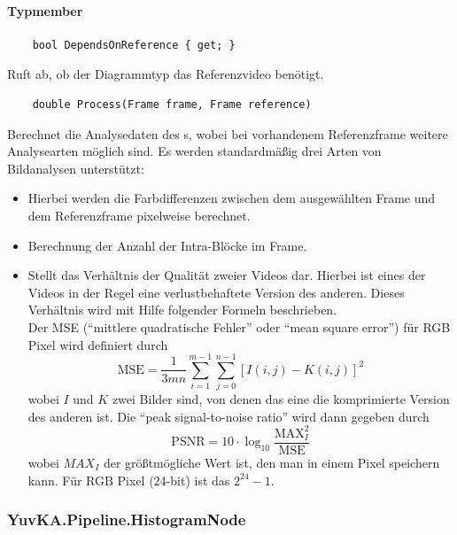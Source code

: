 \paragraph{Typmember}
\begin{itemize}

	\begin{verbatim}
	bool DependsOnReference { get; } 
	\end{verbatim}
	Ruft ab, ob der Diagrammtyp das Referenzvideo benötigt.
	
	\begin{verbatim}
	double Process(Frame frame, Frame reference)
	\end{verbatim}
	Berechnet die Analysedaten des s, wobei bei vorhandenem Referenzframe weitere Analysearten möglich sind. Es werden standardmäßig drei Arten von Bildanalysen unterstützt:
		\begin{itemize}
			\item {} Hierbei werden die Farbdifferenzen zwischen dem ausgewählten Frame und dem Referenzframe pixelweise berechnet.
			\item {} Berechnung der Anzahl der Intra-Blöcke im Frame.
			\item {} Stellt das Verhältnis der Qualität zweier Videos dar. Hierbei ist eines der Videos in der Regel eine verlustbehaftete Version des anderen. Dieses Verhältnis wird mit Hilfe folgender Formeln beschrieben. \\
			Der MSE (``mittlere quadratische Fehler'' oder ``mean square error'') für RGB Pixel wird definiert durch 
			\[ \text{MSE} = \frac{1}{3mn} \sum_{i = 1}^{m - 1}{ \sum_{j = 0}^{n - 1}{[I(i, j) - K(i, j)]^2} } \]
			wobei $ I $ und $ K $ zwei Bilder sind, von denen das eine die komprimierte Version des anderen ist. Die ``peak signal-to-noise ratio'' wird dann gegeben durch
			\[ \text{PSNR} = 10 \cdot \log_{10}{\frac{\text{MAX}_I^2}{\text{MSE}}} \]
			wobei $ MAX_I $ der größtmögliche Wert ist, den man in einem Pixel speichern kann. Für RGB Pixel (24-bit) ist das $ 2^{24} - 1 $.
		\end{itemize}
		
\end{itemize}

\subsubsection{YuvKA.Pipeline.HistogramNode}


